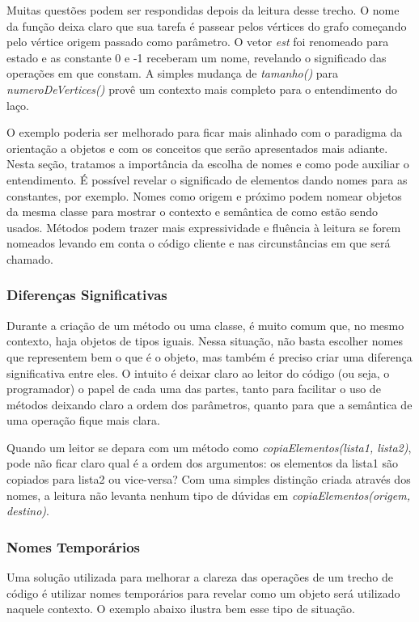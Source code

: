 Muitas questões podem ser respondidas depois da leitura desse trecho. O nome da função deixa claro que sua tarefa é passear pelos vértices do 
grafo começando pelo vértice origem passado como parâmetro. O vetor \textit{est} foi renomeado para estado e as constante 0 e -1 receberam um 
nome, revelando o significado das operações em que constam. A simples mudança de \textit{tamanho()} para \textit{numeroDeVertices()} provê um 
contexto mais completo para o entendimento do laço.
	
O exemplo poderia ser melhorado para ficar mais alinhado com o paradigma da orientação a objetos e com os conceitos que serão apresentados mais adiante. Nesta seção, tratamos a importância da escolha de nomes e como pode auxiliar o entendimento. É possível revelar o significado de elementos dando nomes para as constantes, por exemplo. Nomes como origem e próximo podem nomear objetos da mesma classe para mostrar o contexto e semântica de como estão sendo usados. Métodos podem trazer mais expressividade e fluência à leitura se forem nomeados levando em conta o código cliente e nas circunstâncias em que será chamado.

\subsubsection{Diferenças Significativas}
Durante a criação de um método ou uma classe, é muito comum que, no mesmo contexto, haja  objetos de tipos iguais. Nessa situação, não basta escolher nomes que representem bem o que é o objeto, mas também é preciso criar uma diferença significativa entre eles. O intuito é deixar claro ao leitor do código  (ou seja, o programador) o papel de cada uma das partes, tanto para facilitar o uso de métodos deixando claro a ordem dos parâmetros, quanto para que a semântica de uma operação fique mais clara.
	
Quando um leitor se depara com um método como \textit{copiaElementos(lista1, lista2)}, pode não ficar claro qual é a ordem dos argumentos: os elementos da lista1 são copiados para lista2 ou vice-versa? Com uma simples distinção criada através dos nomes, a leitura não levanta nenhum tipo de dúvidas em \textit{copiaElementos(origem, destino)}.

\subsubsection{Nomes Temporários}
Uma solução utilizada para melhorar a clareza das operações de um trecho de código é utilizar nomes temporários para revelar como um objeto será utilizado naquele contexto. O exemplo abaixo ilustra bem esse tipo de situação.

